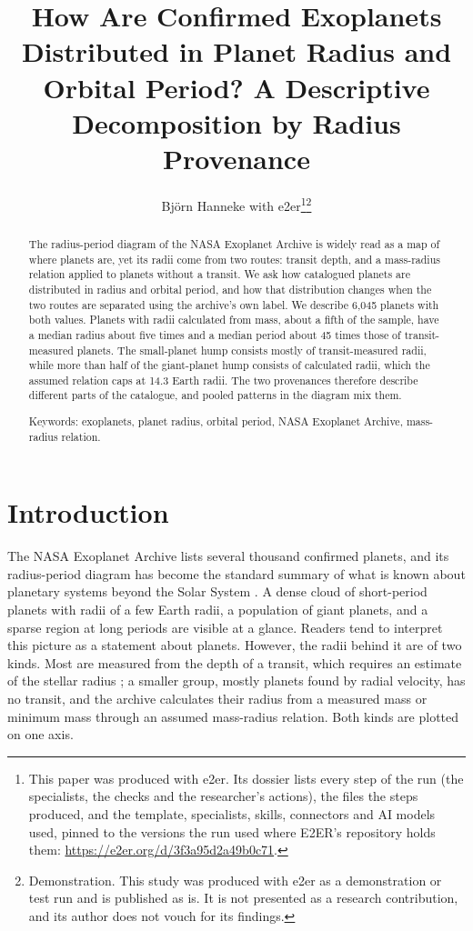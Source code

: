 \documentclass[11pt]{article}
\title{How Are Confirmed Exoplanets Distributed in Planet Radius and Orbital Period? A Descriptive Decomposition by Radius Provenance}
\date{}
\author{Björn Hanneke with e2er\thanks{This paper was produced with e2er. Its dossier lists every step of the run (the specialists, the checks and the researcher's actions), the files the steps produced, and the template, specialists, skills, connectors and AI models used, pinned to the versions the run used where E2ER's repository holds them: \url{https://e2er.org/d/3f3a95d2a49b0c71}.}\thanks{Demonstration. This study was produced with e2er as a demonstration or test run and is published as is. It is not presented as a research contribution, and its author does not vouch for its findings.}}
\begin{document}
\maketitle

\begin{abstract}
\noindent The radius-period diagram of the NASA Exoplanet Archive is widely read as a map of where planets are, yet its radii come from two routes: transit depth, and a mass-radius relation applied to planets without a transit. We ask how catalogued planets are distributed in radius and orbital period, and how that distribution changes when the two routes are separated using the archive's own label. We describe 6,045 planets with both values.
Planets with radii calculated from mass, about a fifth of the sample, have a median radius about five times and a median period about 45 times those of transit-measured planets.
The small-planet hump consists mostly of transit-measured radii, while more than half of the giant-planet hump consists of calculated radii, which the assumed relation caps at 14.3 Earth radii.
The two provenances therefore describe different parts of the catalogue, and pooled patterns in the diagram mix them.

\medskip
\noindent Keywords: exoplanets, planet radius, orbital period, NASA Exoplanet Archive, mass-radius relation.
\end{abstract}

\section{Introduction}

The NASA Exoplanet Archive lists several thousand confirmed planets, and its radius-period diagram has become the standard summary of what is known about planetary systems beyond the Solar System \cite{Christiansen2025_NEA,cloutier2024exoplanet}. A dense cloud of short-period planets with radii of a few Earth radii, a population of giant planets, and a sparse region at long periods are visible at a glance. Readers tend to interpret this picture as a statement about planets. However, the radii behind it are of two kinds. Most are measured from the depth of a transit, which requires an estimate of the stellar radius \cite{berger2018revised}; a smaller group, mostly planets found by radial velocity, has no transit, and the archive calculates their radius from a measured mass or minimum mass through an assumed mass-radius relation. Both kinds are plotted on one axis.
\end{document}
